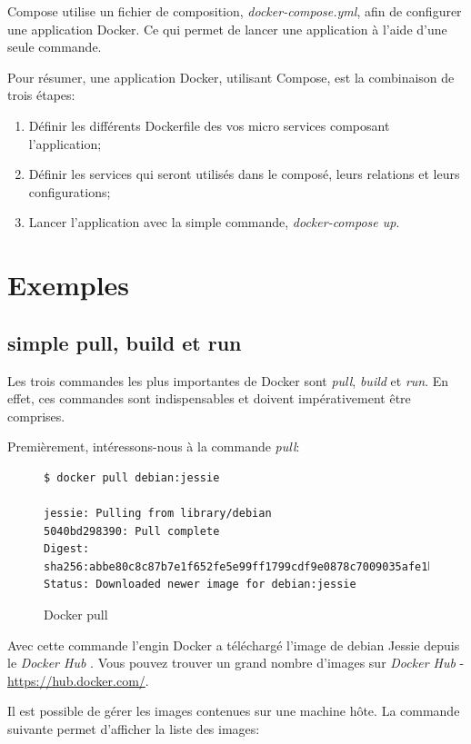Compose utilise un fichier de composition, \emph{docker-compose.yml}, afin de configurer une application Docker. Ce qui permet de lancer une application à l'aide d'une seule commande. 

Pour résumer, une application Docker, utilisant Compose, est la combinaison de trois étapes:

\begin{enumerate}
\item Définir les différents Dockerfile des vos micro services composant l'application;
\item Définir les services qui seront utilisés dans le composé, leurs relations et leurs configurations;
\item Lancer l'application avec la simple commande, \emph{docker-compose up}.
\end{enumerate}

\section{Exemples}
\subsection{simple pull, build et run}
Les trois commandes les plus importantes de Docker sont \emph{pull}, \emph{build} et \emph{run}. En effet, ces commandes sont indispensables et doivent impérativement être comprises.

Premièrement, intéressons-nous à la commande \emph{pull}:

\begin{figure}[H] 
\centering 
\begin{lstlisting}[frame=single]
$ docker pull debian:jessie

jessie: Pulling from library/debian
5040bd298390: Pull complete 
Digest: sha256:abbe80c8c87b7e1f652fe5e99ff1799cdf9e0878c7009035afe1bccac129cad8
Status: Downloaded newer image for debian:jessie
\end{lstlisting}
\caption[Code - Docker pull]{Docker pull}
\label{fig:dockerPull} 
\end{figure}

Avec cette commande l'engin Docker a téléchargé l'image de debian Jessie depuis le \emph{Docker Hub} \cite{3}. Vous pouvez trouver un grand nombre d'images sur \emph{Docker Hub} - \hyperref[Docker Hub]{https://hub.docker.com/}.

Il est possible de gérer les images contenues sur une machine hôte. La commande suivante permet d'afficher la liste des images:

